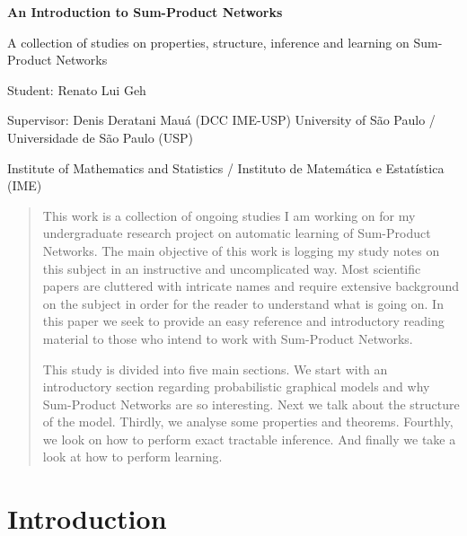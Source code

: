 \documentclass[a4paper,10pt]{article}
\theoremstyle{plain}
\begin{document}
\begin{titlepage}
  \begin{center}
    \LARGE
    \textbf{An Introduction to Sum-Product Networks}

    \vspace{1.7cm}
    \Large
    A collection of studies on properties, structure, inference and learning on Sum-Product
    Networks

    \vspace{1.7cm}
    \large
    Student: Renato Lui Geh

    Supervisor: Denis Deratani Mauá (DCC IME-USP)
    \vfill
    \large
    University of São Paulo / Universidade de São Paulo (USP)

    Institute of Mathematics and Statistics / Instituto de Matemática e Estatística (IME)
    \vspace{1.5cm}
  \end{center}
\end{titlepage}

\newpage
\null\vspace{\fill}
\begin{abstract}
  \large
  This work is a collection of ongoing studies I am working on for my undergraduate research
  project on automatic learning of Sum-Product Networks. The main objective of this work is logging
  my study notes on this subject in an instructive and uncomplicated way. Most scientific papers
  are cluttered with intricate names and require extensive background on the subject in order for
  the reader to understand what is going on. In this paper we seek to provide an easy reference and
  introductory reading material to those who intend to work with Sum-Product Networks.

  This study is divided into five main sections. We start with an introductory section regarding
  probabilistic graphical models and why Sum-Product Networks are so interesting. Next we talk
  about the structure of the model. Thirdly, we analyse some properties and theorems. Fourthly, we
  look on how to perform exact tractable inference. And finally we take a look at how to perform
  learning.
\end{abstract}
\vspace{\fill}
\newpage
\large
\tableofcontents
\normalsize
\newpage

\section{Introduction}
\end{document}
